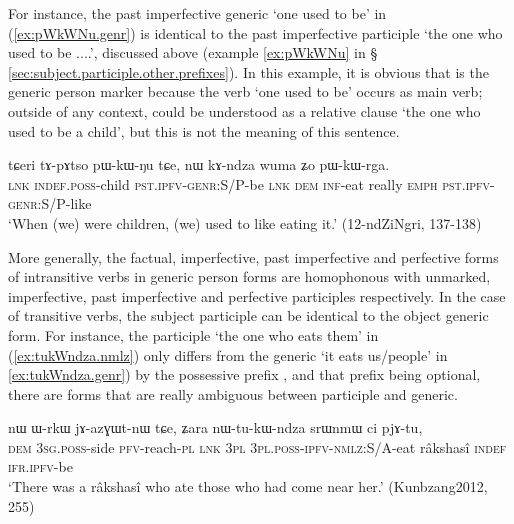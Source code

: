 For instance, the past imperfective generic  `one used to be' in (\ref{ex:pWkWNu.genr}) is identical to the past imperfective participle  `the one who used to be ....', discussed above (example \ref{ex:pWkWNu} in § \ref{sec:subject.participle.other.prefixes}). In this example, it is obvious that  is the generic person marker because the verb  `one used to be' occurs as main verb; outside of any context,   could be understood as a relative clause `the one who used to be a child', but this is not the meaning of this sentence. 

\begin{exe}
\ex \label{ex:pWkWNu.genr}
 \gll tɕeri tɤ-pɤtso pɯ-kɯ-ŋu tɕe, nɯ kɤ-ndza wuma ʑo pɯ-kɯ-rga. \\
 \textsc{lnk} \textsc{indef}.\textsc{poss}-child \textsc{pst}.\textsc{ipfv}-\textsc{genr}:S/P-be \textsc{lnk} \textsc{dem} \textsc{inf}-eat really \textsc{emph} \textsc{pst}.\textsc{ipfv}-\textsc{genr}:S/P-like \\
 \glt `When (we) were children, (we) used to like eating it.' (12-ndZiNgri, 137-138)
\end{exe}

More generally, the factual, imperfective, past imperfective and perfective forms of intransitive verbs in generic person forms are homophonous with unmarked, imperfective, past imperfective and perfective participles respectively. In the case of transitive verbs, the subject participle can be identical to the object generic form. For instance, the participle  `the one who eats them' in (\ref{ex:tukWndza.nmlz}) only differs from the generic  `it eats us/people' in \ref{ex:tukWndza.genr}) by the possessive prefix , and that prefix being optional, there are forms that are really ambiguous between participle and generic. 

\begin{exe}
\ex \label{ex:tukWndza.nmlz}
 \gll nɯ ɯ-rkɯ jɤ-azɣɯt-nɯ tɕe, ʑara nɯ-tu-kɯ-ndza srɯnmɯ ci pjɤ-tu, \\
 \textsc{dem} \textsc{3sg}.\textsc{poss}-side \textsc{pfv}-reach-\textsc{pl} \textsc{lnk} \textsc{3pl} \textsc{3pl}.\textsc{poss}-\textsc{ipfv}-\textsc{nmlz}:S/A-eat râkshasî \textsc{indef} \textsc{ifr}.\textsc{ipfv}-be \\
\glt `There was a râkshasî who ate those who had come near her.' (Kunbzang2012, 255)
\end{exe}

